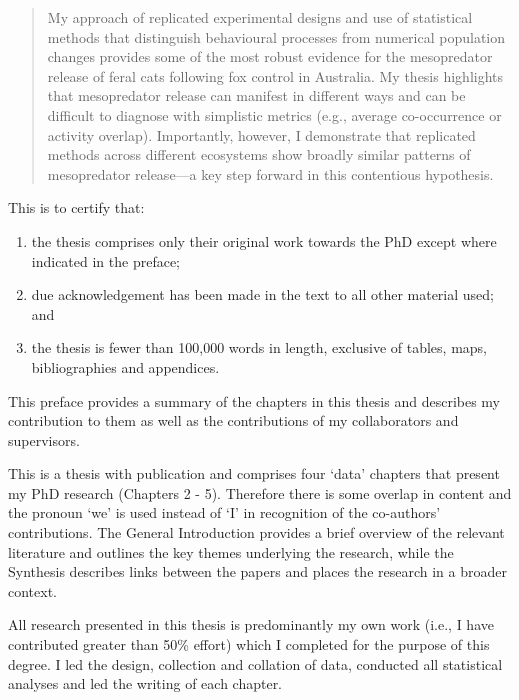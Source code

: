 \documentclass[11pt,a4paper,titlepage,twoside,openright]{style/unimelbthesis}
\begin{document}
\begin{frontmatter}
\begin{abstract}
    My approach of replicated experimental designs and use of statistical methods that distinguish behavioural processes from numerical population changes provides some of the most robust evidence for the mesopredator release of feral cats following fox control in Australia. My thesis highlights that mesopredator release can manifest in different ways and can be difficult to diagnose with simplistic metrics (e.g., average co-occurrence or activity overlap). Importantly, however, I demonstrate that replicated methods across different ecosystems show broadly similar patterns of mesopredator release---a key step forward in this contentious hypothesis.
  \end{abstract}
  \begin{declaration}
    This is to certify that:
    \begin{enumerate}
    \def\labelenumi{\roman{enumi}.}
    \tightlist
    \item
      the thesis comprises only their original work towards the PhD except where indicated in the preface;
    \item
      due acknowledgement has been made in the text to all other material
      used; and
    \item
      the thesis is fewer than 100,000 words in length, exclusive of
      tables, maps, bibliographies and appendices.
    \end{enumerate}
  \end{declaration}
  \begin{preface}
    This preface provides a summary of the chapters in this thesis and describes my contribution to them as well as the contributions of my collaborators and supervisors.
    
    This is a thesis with publication and comprises four `data' chapters that present my PhD research (Chapters 2 - 5). Therefore there is some overlap in content and the pronoun `we' is used instead of `I' in recognition of the co-authors' contributions. The General Introduction provides a brief overview of the relevant literature and outlines the key themes underlying the research, while the Synthesis describes links between the papers and places the research in a broader context.
    
    All research presented in this thesis is predominantly my own work (i.e., I have contributed greater than 50\% effort) which I completed for the purpose of this degree. I led the design, collection and collation of data, conducted all statistical analyses and led the writing of each chapter.
    

\end{preface}
\end{frontmatter}
\end{document}

